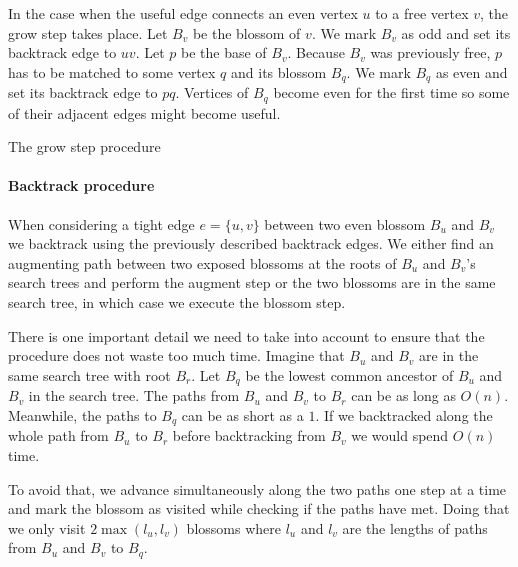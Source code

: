 In the case when the useful edge connects an even vertex $u$ to a free vertex $v$, the grow step takes place. Let $B_v$ be the blossom of $v$. We mark $B_v$ as odd and set its backtrack edge to $uv$. Let $p$ be the base of $B_v$. Because $B_v$ was previously free, $p$ has to be matched to some vertex $q$ and its blossom $B_q$. We mark $B_q$ as even and set its backtrack edge to $pq$. Vertices of $B_q$ become even for the first time so some of their adjacent edges might become useful.

\begin{algorithm}
\caption{The grow step procedure}\label{alg:grow_step}
\begin{algorithmic}[1]
\EndProcedure
\end{algorithmic}
\end{algorithm}

\paragraph*{Backtrack procedure}

When considering a tight edge $e=\{u, v\}$ between two even blossom $B_u$ and $B_v$ we backtrack using the previously described backtrack edges. We either find an augmenting path between two exposed blossoms at the roots of $B_u$ and $B_v$'s search trees and perform the augment step or the two blossoms are in the same search tree, in which case we execute the blossom step. 

There is one important detail we need to take into account to ensure that the procedure does not waste too much time. Imagine that $B_u$ and $B_v$ are in the same search tree with root $B_r$. Let $B_q$ be the lowest common ancestor of $B_u$ and $B_v$ in the search tree. The paths from $B_u$ and $B_v$ to $B_r$ can be as long as $O(n)$. Meanwhile, the paths to $B_q$ can be as short as a $1$. If we backtracked along the whole path from $B_u$ to $B_r$ before backtracking from $B_v$ we would spend $O(n)$ time. 

To avoid that, we advance simultaneously along the two paths one step at a time and mark the blossom as visited while checking if the paths have met. Doing that we only visit $2\max(l_u, l_v)$ blossoms where $l_u$ and $l_v$ are the lengths of paths from $B_u$ and $B_v$ to $B_q$.


